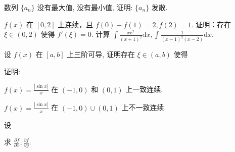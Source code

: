\par{}
数列 $\{a_{n}\}$ 没有最大值, 没有最小值, 证明: $\{a_{n}\}$ 发散.\par
\par{}
$f(x)$ 在 $[0,2]$ 上连续，且 $f(0) + f(1) = 2, f(2) = 1$. 证明：存在 $\xi \in (0,2)$ 使得 $f'(\xi) = 0$.
计算 $\int \frac{x\mathrm{e}^x}{(x + 1)^2}\mathrm{d}x,\int \frac{1}{(x - 1)^2(x - 2)}\mathrm{d}x.$\par
\par{}
\par{}
设 $f(x)$ 在 $[a, b]$ 上三阶可导, 证明存在 $\xi \in (a, b)$ 使得\par
\nopagebreak[4]
\par{}
证明:\par
$f(x) = \frac{|\sin x|}{x}$ 在 $(-1,0)$ 和 $(0,1)$ 上一致连续.\par
$f(x) = \frac{|\sin x|}{x}$ 在 $(-1,0)\cup (0,1)$ 上不一致连续.\par
\par{}
\par{}
设\par
\nopagebreak[4]
求  $\frac{\partial f}{\partial x}, \frac{\partial f}{\partial y}.$\par

